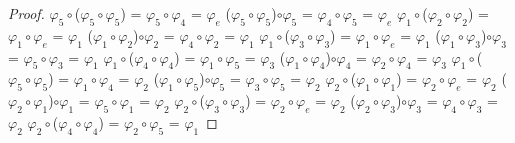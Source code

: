 \documentclass[10pt,a4paper,oneside]{article}
\begin{document}
\begin{proof}
				$\varphi_{5}\circ$($\varphi_{5}\circ\varphi_{5}$) = $\varphi_{5}\circ\varphi_{4}$ = $\varphi_{e}$
				\newline
				($\varphi_{5}\circ\varphi_{5}$)$\circ\varphi_{5}$ = $\varphi_{4}\circ\varphi_{5}$ = $\varphi_{e}$
				\newline
				\newline
				$\varphi_{1}\circ$($\varphi_{2}\circ\varphi_{2}$) = $\varphi_{1}\circ\varphi_{e}$ = $\varphi_{1}$
				\newline
				($\varphi_{1}\circ\varphi_{2}$)$\circ\varphi_{2}$ = $\varphi_{4}\circ\varphi_{2}$ = $\varphi_{1}$
				\newline
				\newline
				$\varphi_{1}\circ$($\varphi_{3}\circ\varphi_{3}$) = $\varphi_{1}\circ\varphi_{e}$ = $\varphi_{1}$
				\newline
				($\varphi_{1}\circ\varphi_{3}$)$\circ\varphi_{3}$ = $\varphi_{5}\circ\varphi_{3}$ = $\varphi_{1}$
				\newline
				\newline
				$\varphi_{1}\circ$($\varphi_{4}\circ\varphi_{4}$) = $\varphi_{1}\circ\varphi_{5}$ = $\varphi_{3}$
				\newline
				($\varphi_{1}\circ\varphi_{4}$)$\circ\varphi_{4}$ = $\varphi_{2}\circ\varphi_{4}$ = $\varphi_{3}$
				\newline
				\newline
				$\varphi_{1}\circ$($\varphi_{5}\circ\varphi_{5}$) = $\varphi_{1}\circ\varphi_{4}$ = $\varphi_{2}$
				\newline
				($\varphi_{1}\circ\varphi_{5}$)$\circ\varphi_{5}$ = $\varphi_{3}\circ\varphi_{5}$ = $\varphi_{2}$
				\newline
				\newline
				$\varphi_{2}\circ$($\varphi_{1}\circ\varphi_{1}$) = $\varphi_{2}\circ\varphi_{e}$ = $\varphi_{2}$
				\newline
				($\varphi_{2}\circ\varphi_{1}$)$\circ\varphi_{1}$ = $\varphi_{5}\circ\varphi_{1}$ = $\varphi_{2}$
				\newline
				\newline
				$\varphi_{2}\circ$($\varphi_{3}\circ\varphi_{3}$) = $\varphi_{2}\circ\varphi_{e}$ = $\varphi_{2}$
				\newline
				($\varphi_{2}\circ\varphi_{3}$)$\circ\varphi_{3}$ = $\varphi_{4}\circ\varphi_{3}$ = $\varphi_{2}$
				\newline
				\newline
				$\varphi_{2}\circ$($\varphi_{4}\circ\varphi_{4}$) = $\varphi_{2}\circ\varphi_{5}$ = $\varphi_{1}$

\end{proof}
\end{document}
